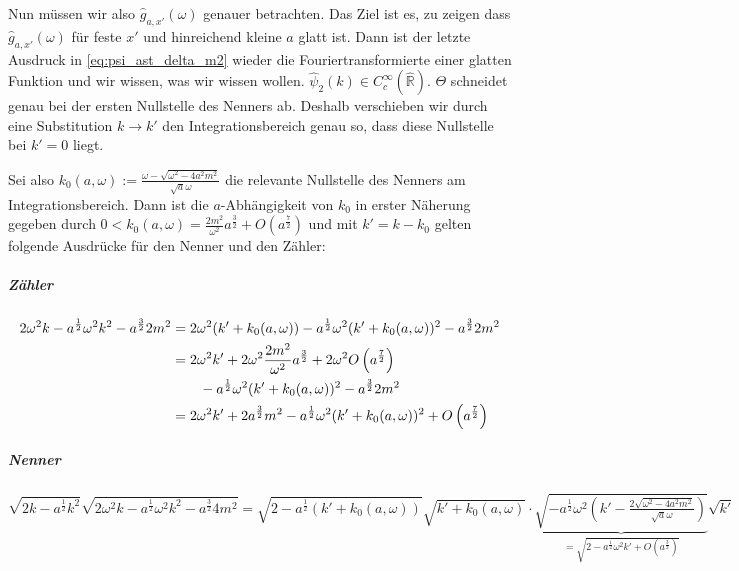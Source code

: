 Nun müssen wir also $\hat g_{a,x'}(\omega)$ genauer betrachten. Das Ziel ist es, zu zeigen dass \(\hat g_{a,x'}(\omega)\) für feste \(x'\) und hinreichend kleine \(a\) glatt ist. Dann ist der letzte Ausdruck in \cref{eq:psi_ast_delta_m2} wieder die Fouriertransformierte einer glatten Funktion und wir wissen, was wir wissen wollen.
$\hat\psi_2(k) \in C^\infty_c(\mathbb{\hat R})$. $\Theta$ schneidet genau bei der ersten Nullstelle des Nenners ab. Deshalb verschieben wir durch eine Substitution $k \rightarrow k'$ den Integrationsbereich genau so, dass diese Nullstelle bei $k' = 0$ liegt.

Sei also $k_0(a,\omega) := \frac{\omega-\sqrt{\omega^2 - 4a^2m^2}}{\sqrt{a}\omega}$ die relevante Nullstelle des Nenners am Integrationsbereich.
Dann ist die $a$-Abhängigkeit von $k_0$ in erster Näherung gegeben durch $0 < k_0(a,\omega) = \frac{2m^2}{\omega^2}a^{\frac{3}{2}} + O\left(a^{\frac{7}{2}}\right)$
und mit $k'=k-k_0$ gelten folgende Ausdrücke für den Nenner und den Zähler:

\subparagraph*{Zähler}
\begin{align*}
    2 \omega^2k-a^{\frac{1}{2}} \omega^2 k^2-a^{\frac{3}{2}}2m^2
    &=
    2\omega^2(k'+k_0(a,\omega))-a^{\frac{1}{2}}\omega^2(k'+k_0(a,\omega))^2-a^{\frac{3}{2}}2m^2
    \\ &=
    2 \omega^2 k' + 2 \omega^2 \frac{2m^2}{\omega^2} a^{\frac{3}{2}}
        + 2 \omega^2 O\left(a^{\frac{7}{2}}\right)
        \\  &\kern 2em-  a^{\frac{1}{2}} \omega^2(k'+k_0(a,\omega))^2
        -a^{\frac{3}{2}}2m^2
    \\ &=
    2 \omega^2k'+2a^{\frac{3}{2}}m^2-a^{\frac{1}{2}}\omega^2(k'+k_0(a,\omega))^2
        + O\left(a^{\frac{7}{2}}\right)
\end{align*}

\subparagraph*{Nenner}
\begin{dmath*}
    \sqrt{2 k-a^{\frac{1}{2}}k^2}
    \sqrt{2 \omega^2k-a^{\frac{1}{2}}\omega^2k^2-a^{\frac{3}{2}}4m^2}
    =
    \sqrt{2-a^{\frac{1}{2}}(k'+k_0(a,\omega))} \sqrt{k'+k_0(a,\omega)}
    \cdot
    \underbrace{
    \sqrt{
            -a^{\frac{1}{2}}\omega^2\left(k'-\tfrac{2\sqrt{\omega^2-4a^2m^2}}
                    {\sqrt a \omega}\right)
        }
    }_{= \sqrt{2-a^{\frac{1}{2}}\omega^2 k' + O\left(a^{\frac{3}{2}}\right)}}
    \sqrt{k'}
\end{dmath*}

